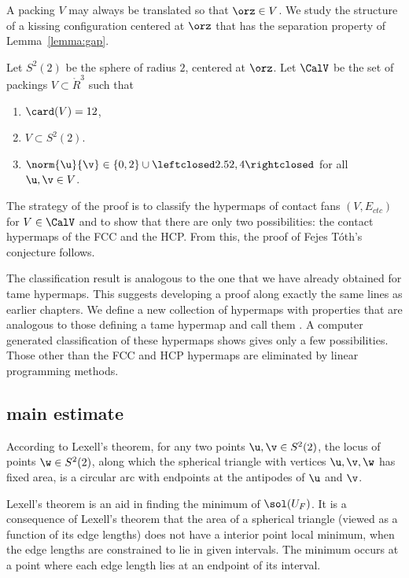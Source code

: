 A packing $V$ may always be translated so that $\orz\in V$.  We study
the structure of a kissing configuration centered at $\orz$ that
has the separation property of Lemma~\ref{lemma:gap}.

\begin{definition}[$S^2(2)$,~$\CalV$]
  Let $S^2(2)$ be the sphere of radius $2$, centered at $\orz$.  Let
  $\CalV$ be the set of packings $V\subset \ring{R}^3$ such that
\begin{enumerate}\wasitemize 
\item $\card(V) = 12$,
\item $V\subset S^2(2)$.
\item $\norm{\u}{\v} \in \{0,2\}\cup
  \leftclosed2.52,4\rightclosed$ for all $\u,\v\in V$.
\end{enumerate}\wasitemize 
{}%
%
\end{definition}

The strategy of the proof is to classify the hypermaps of contact
fans $(V,E_{ctc})$ for $V\in \CalV$ and to show that there are only two
possibilities: the contact hypermaps of the FCC and the HCP.  From
this, the proof of Fejes T\'oth's conjecture follows.

The classification result is analogous to the one that we have already
obtained for tame hypermaps.  This suggests developing a proof along
exactly the same lines as earlier chapters.  We define a new
collection of hypermaps with properties that are analogous to those
defining a tame hypermap and call them .  A computer generated classification of these hypermaps
shows gives only a few possibilities.  Those other than the FCC and
HCP hypermaps are eliminated by linear programming methods.

\subsection{main estimate}




\begin{remark}
According to Lexell's theorem, for any two points $\u,\v\in S^2(2)$,
the locus of points $\w\in S^2(2)$, along which
the spherical triangle with vertices $\u,\v,\w$ has fixed area, is a circular arc
with endpoints at the antipodes of $\u$ and $\v$.



Lexell's theorem is an aid in finding the minimum of
  $\sol(U_F)$.
  It is a consequence of Lexell's theorem that the area of a spherical
  triangle (viewed as a function of its edge lengths) does not have a
  interior point local minimum, when the edge lengths are
  constrained to lie in given intervals.  The minimum occurs at a
  point where each edge length lies at an endpoint of its interval.
%
\end{remark}

